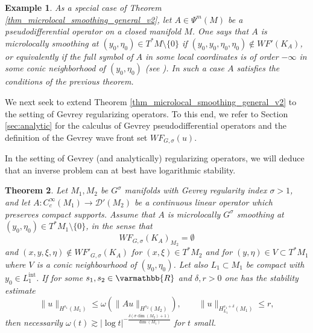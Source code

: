\documentclass[12pt,twoside]{amsart}
\numberwithin{equation}{section}
\renewcommand{\leq}{\leqslant}
\renewcommand{\mathbb}{\varmathbb}
\newtheorem{theorem}{Theorem}[section]
\newtheorem{example}[theorem]{Example}
\newcommand{\mR}{\mathbb{R}}                    %
\newcommand{\abs}[1]{\lvert #1 \rvert}          %
\newcommand{\norm}[1]{\lVert #1 \rVert}         %
\begin{document}
\begin{example}
As a special case of Theorem \ref{thm_microlocal_smoothing_general_v2}, let $A \in \Psi^m(M)$ be a pseudodifferential operator on a closed manifold $M$. One says that $A$ is microlocally smoothing at $(y_0, \eta_0) \in T^* M \setminus \{0\}$ if $(y_0,y_0,\eta_0,\eta_0) \notin WF'(K_A)$, or equivalently if the full symbol of $A$ in some local coordinates is of order $-\infty$ in some conic neighborhood of $(y_0,\eta_0)$ (see \cite[Proposition 18.1.26]{Hoermander}). In such a case $A$ satisfies the conditions of the previous theorem.
\end{example}



We next seek to extend Theorem \ref{thm_microlocal_smoothing_general_v2} to the setting of Gevrey regularizing operators. To this end, we refer to Section \ref{sec:analytic} for the calculus of Gevrey pseudodifferential operators and the definition of the Gevrey wave front set $WF_{G,\sigma}(u)$.


In the setting of Gevrey (and analytically) regularizing operators, we will deduce that an inverse problem can at best have logarithmic stability.


\begin{theorem} \label{thm_microlocal_smoothing_general_analytic}
Let $M_1, M_2$ be $G^{\sigma}$ manifolds with Gevrey regularity index $\sigma>1$, and let $A: C^{\infty}_c(M_1) \to \mathcal{D}'(M_2)$ be a continuous linear operator which preserves compact supports. Assume that $A$ is microlocally $G^{\sigma}$ smoothing at $(y_0,\eta_0) \in T^* M_1 \setminus \{0\}$, in the sense that $$WF_{G,\sigma}(K_A)_{M_2} = \emptyset$$ and $(x,y,\xi,\eta) \notin WF'_{G,\sigma}(K_A)$ for  $(x,\xi) \in T^* M_2$ and for $(y,\eta) \in V \subset T^{\ast} M_1$ where $V$ is a conic neighbourhood of $(y_0,\eta_0)$. Let also $L_1 \subset M_1$ be compact with $y_0 \in L_1^{\mathrm{int}}$. If for some $s_1, s_2 \in \mR$ and $\delta, r > 0$ one has the stability estimate 
\begin{equation} \label{microlocal_smoothing_log_claim}
\norm{u}_{H^{s_1}(M_1)} \leq \omega(\norm{Au}_{H^{s_2}(M_2)}), \qquad \norm{u}_{H^{s_1+\delta}_{L_1}(M_1)} \leq r,
\end{equation}
then necessarily $\omega(t) \gtrsim \abs{\log t}^{-\frac{\delta(\sigma \dim(M_2) +1)}{\dim(M_1)}}$ for $t$ small.
\end{theorem}
\end{document}
